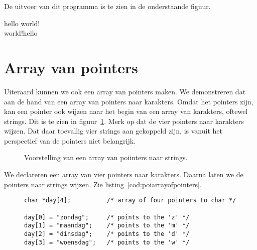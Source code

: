 De uitvoer van dit programma is te zien in de onderstaande figuur.

\begin{dosbox}
hello world!\\
world!hello
\end{dosbox}


\section{Array van pointers}
Uiteraard kunnen we ook een array van pointers maken. We demonstreren dat aan de hand van een array van pointers naar karakters. Omdat het pointers zijn, kan een pointer ook wijzen naar het begin van een array van karakters, oftewel strings. Dit is te zien in figuur~\ref{fig:poiarrayofpointers}. Merk op dat de vier pointers naar karakters wijzen. Dat daar toevallig vier strings aan gekoppeld zijn, is vanuit het perspectief van de pointers niet belangrijk.

\begin{figure}[!ht]
\centering
{}
\caption{Voorstelling van een array van poiinters naar strings.}
\label{fig:poiarrayofpointers}
\end{figure}

We declareren een array van vier pointers naar karakters. Daarna laten we de pointers naar strings wijzen. Zie listing~\ref{cod:poiarrayofpointers}.

\begin{figure}[!ht]
\begin{lstlisting}[caption=Een array van pointers.,label=cod:poiarrayofpointers]
char *day[4];          /* array of four pointers to char */

day[0] = "zondag";     /* points to the 'z' */
day[1] = "maandag";    /* points to the 'm' */
day[2] = "dinsdag";    /* points to the 'd' */
day[3] = "woensdag";   /* points to the 'w' */
\end{lstlisting}
\end{figure}

